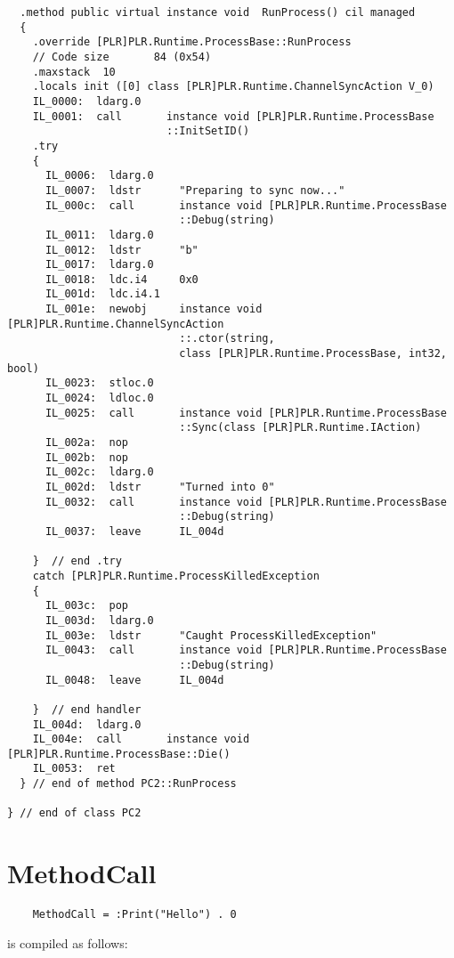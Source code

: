 \begin{lstlisting}
  .method public virtual instance void  RunProcess() cil managed
  {
    .override [PLR]PLR.Runtime.ProcessBase::RunProcess
    // Code size       84 (0x54)
    .maxstack  10
    .locals init ([0] class [PLR]PLR.Runtime.ChannelSyncAction V_0)
    IL_0000:  ldarg.0
    IL_0001:  call       instance void [PLR]PLR.Runtime.ProcessBase
                         ::InitSetID()
    .try
    {
      IL_0006:  ldarg.0
      IL_0007:  ldstr      "Preparing to sync now..."
      IL_000c:  call       instance void [PLR]PLR.Runtime.ProcessBase
                           ::Debug(string)
      IL_0011:  ldarg.0
      IL_0012:  ldstr      "b"
      IL_0017:  ldarg.0
      IL_0018:  ldc.i4     0x0
      IL_001d:  ldc.i4.1
      IL_001e:  newobj     instance void [PLR]PLR.Runtime.ChannelSyncAction
                           ::.ctor(string, 
                           class [PLR]PLR.Runtime.ProcessBase, int32, bool)
      IL_0023:  stloc.0
      IL_0024:  ldloc.0
      IL_0025:  call       instance void [PLR]PLR.Runtime.ProcessBase
                           ::Sync(class [PLR]PLR.Runtime.IAction)
      IL_002a:  nop
      IL_002b:  nop
      IL_002c:  ldarg.0
      IL_002d:  ldstr      "Turned into 0"
      IL_0032:  call       instance void [PLR]PLR.Runtime.ProcessBase
                           ::Debug(string)
      IL_0037:  leave      IL_004d

    }  // end .try
    catch [PLR]PLR.Runtime.ProcessKilledException 
    {
      IL_003c:  pop
      IL_003d:  ldarg.0
      IL_003e:  ldstr      "Caught ProcessKilledException"
      IL_0043:  call       instance void [PLR]PLR.Runtime.ProcessBase
                           ::Debug(string)
      IL_0048:  leave      IL_004d

    }  // end handler
    IL_004d:  ldarg.0
    IL_004e:  call       instance void [PLR]PLR.Runtime.ProcessBase::Die()
    IL_0053:  ret
  } // end of method PC2::RunProcess

} // end of class PC2
\end{lstlisting}

\section{MethodCall}

	\begin{verbatim}
	MethodCall = :Print("Hello") . 0
	\end{verbatim}
	
	is compiled as follows:

